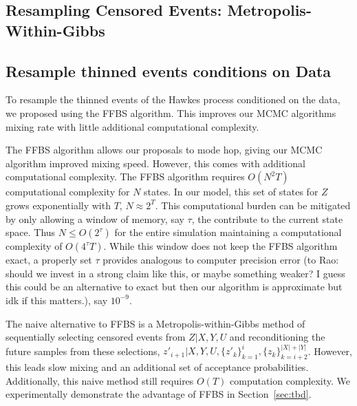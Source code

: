 \documentclass[11pt]{article}
\newcommand{\algrule}[1][.2pt]{\par\vskip.5\baselineskip\hrule height #1\par\vskip.5\baselineskip}
\begin{document}


\subsection{Resampling Censored Events: Metropolis-Within-Gibbs}


\subsection{Resample thinned events conditions on Data}

To resample the thinned events of the Hawkes process conditioned on the data, we proposed using the FFBS algorithm. This improves our MCMC algorithms mixing rate with little additional computational complexity.



The FFBS algorithm allows our proposals to mode hop, giving our MCMC algorithm improved mixing speed. However, this comes with additional computational complexity. The FFBS algorithm requires $O(N^2T)$ computational complexity for $N$ states. In our model, this set of states for $Z$ grows exponentially with $T$, $N \approx 2^T$. This computational burden can be mitigated by only allowing a window of memory, say $\tau$, the contribute to the current state space. Thus $N \leq O(2^\tau)$ for the entire simulation maintaining a computational complexity of $O(4^{\tau} T)$. While this window does not keep the FFBS algorithm exact, a properly set $\tau$ provides analogous to computer precision error (to Rao: should we invest in a strong claim like this, or maybe something weaker? I guess this could be an alternative to exact but then our algorithm is approximate but idk if this matters.), say $10^{-9}$.


The naive alternative to FFBS is a Metropolis-within-Gibbs method of sequentially selecting censored events from $Z|X,Y,U$ and reconditioning the future samples from these selections, $z'_{i+1} | X,Y,U,\{z'_k\}_{k=1}^i, \{z_k\}_{k=i+2}^{|X|+|Y|}$. However, this leads slow mixing and an additional set of acceptance probabilities. Additionally, this naive method still requires $O(T)$ computation complexity. We experimentally demonstrate the advantage of FFBS in Section~\ref{sec:tbd}.
\end{document}
